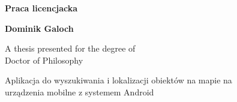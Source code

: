 \documentclass{article}
\begin{document}
	\begin{titlepage}
		\begin{center}
			\textbf{Praca licencjacka}
			\vspace{1cm}
			
			\textbf{Dominik Galoch}
		
       A thesis presented for the degree of\\
       Doctor of Philosophy
       
       Aplikacja do wyszukiwania i lokalizacji obiektów na mapie na \\
       urządzenia mobilne z systemem Android

       
       \end{center}
	\end{titlepage}
\end{document}
